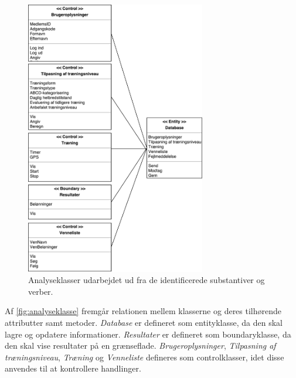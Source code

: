 \begin{figure}[H]
\centering
\includegraphics[width=0.7\textwidth]{figures/aktivitetsdiagram/analyseklasser}
\caption{Analyseklasser udarbejdet ud fra de identificerede substantiver og verber.}
\label{fig:analyseklasse}
\end{figure}

\noindent
Af \autoref{fig:analyseklasse} fremgår relationen mellem klasserne og deres tilhørende attributter samt metoder.  \textit{Database} er defineret som entityklasse, da den skal lagre og opdatere informationer. \textit{Resultater} er defineret som boundaryklasse, da den skal vise resultater på en grænseflade.  \textit{Brugeroplysninger}, \textit{Tilpasning af træningsniveau}, \textit{Træning} og \textit{Venneliste} defineres som controlklasser, idet disse anvendes til at kontrollere handlinger. 

